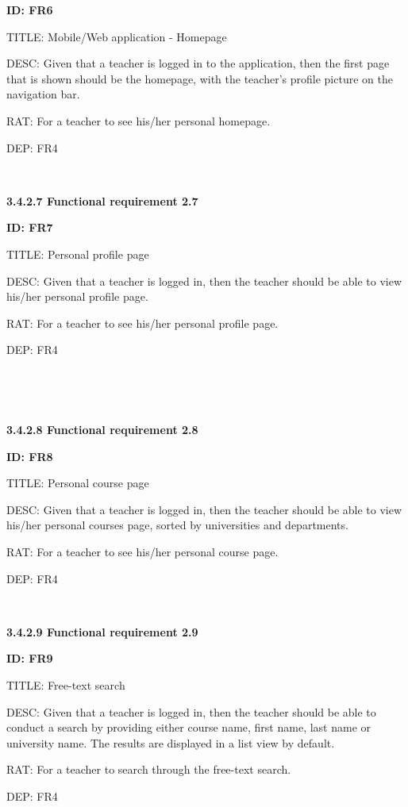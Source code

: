 \documentclass[12pt,a4paper]{article}
\begin{document}
\begin{flushleft}
        \textbf{ID: FR6}

        TITLE: Mobile/Web application - Homepage

        DESC: Given that a teacher is logged in to the application, then the
        first page that is shown should be the homepage, with the teacher's
        profile picture on the navigation bar.

        RAT: For a teacher to see his/her personal homepage.

        DEP: FR4


        \

        \textbf{3.4.2.7 Functional requirement 2.7}

        \textbf{ID: FR7}

        TITLE: Personal profile page

        DESC: Given that a teacher is logged in, then the teacher should be able
        to view his/her personal profile page.

        RAT: For a teacher to see his/her personal profile page.

        DEP: FR4

        \

        \
\newpage


        \textbf{3.4.2.8 Functional requirement 2.8}

        \textbf{ID: FR8}

        TITLE: Personal course page

        DESC: Given that a teacher is logged in, then the teacher should be able
        to view his/her personal courses page, sorted by universities and
        departments.

        RAT: For a teacher to see his/her personal course page.

        DEP: FR4

        \

        \textbf{3.4.2.9 Functional requirement 2.9}

        \textbf{ID: FR9}

        TITLE: Free-text search

        DESC: Given that a teacher is logged in, then the teacher should be able
        to conduct a search by providing either course name, first name, last
        name or university name. The results are displayed in a list view by
        default.

        RAT: For a teacher to search through the free-text search.

        DEP: FR4


\end{flushleft}
\end{document}
